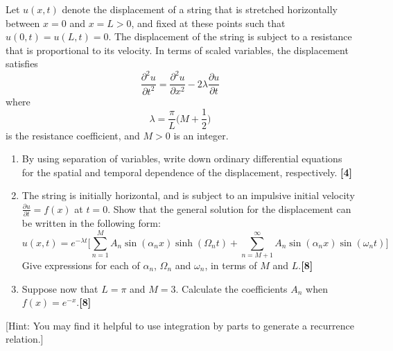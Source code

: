 \documentclass[a4paper]{article}
\begin{document}
\begin{qns}
Let $u(x, t)$ denote the displacement of a string that is stretched horizontally between $x = 0$ and $x = L > 0$, and fixed at these points such that $u(0, t) = u(L, t) = 0$. The displacement of the string is subject to a resistance that is proportional to its velocity. In terms of scaled variables, the displacement satisfies
$$\frac{\partial^2u}{\partial t^2}=\frac{\partial^2u}{\partial x^2}-2\lambda\frac{\partial u}{\partial t}$$
where
$$\lambda=\frac{\pi}{L}\bigg(M+\frac{1}{2}\bigg)$$
is the resistance coefficient, and $M > 0$ is an integer.
\begin{enumerate}[label=(\alph*)]
\item By using separation of variables, write down ordinary differential equations for the spatial and temporal dependence of the displacement, respectively. \hfill\textbf{[4]}
\item The string is initially horizontal, and is subject to an impulsive initial velocity $\frac{\partial u}{\partial t}=f(x)$ at $t = 0$. Show that the general solution for the displacement can be written in the following form:
$$u(x,t)=e^{-\lambda t}\bigg[\sum_{n=1}^MA_n\sin(\alpha_n x)\sinh(\Omega_nt)+\sum_{n=M+1}^\infty A_n\sin(\alpha_nx)\sin(\omega_nt)\bigg]$$
Give expressions for each of $\alpha_n$, $\Omega_n$ and $\omega_n$, in terms of $M$ and $L$.\hfill\textbf{[8]}
\item Suppose now that $L = \pi$ and $M = 3$. Calculate the coefficients $A_n$ when $f(x) = e^{−x}$.\hfill\textbf{[8]}
\end{enumerate}
[Hint: You may find it helpful to use integration by parts to generate a recurrence relation.] 
\end{qns}
\end{document}

